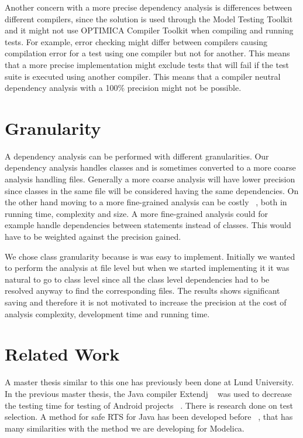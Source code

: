 \documentclass{cslthse-msc}
\begin{document}
Another concern with a more precise dependency analysis is differences between different compilers, since the solution is used through the Model Testing Toolkit and it might not use OPTIMICA Compiler Toolkit  when compiling and running tests. For example, error checking might differ between compilers causing compilation error for a test using one compiler but not for another. This means that a more precise implementation might exclude tests that will fail if the test suite is executed using another compiler. This means that a compiler neutral dependency analysis with a 100\% precision might not be possible. 



\section{Granularity}
A dependency analysis can be performed with different granularities. Our dependency analysis handles classes and is sometimes converted to a more coarse analysis handling files. Generally a more coarse analysis will have lower precision since classes in the same file will be considered having the same dependencies. On the other hand moving to a more fine-grained analysis can be costly ~\cite{DBLP:conf/sigsoft/LegunsenHSLZM16}, both in running time, complexity and size. A more fine-grained analysis could for example handle dependencies between statements instead of classes. This would have to be weighted against the precision gained.

We chose class granularity because is was easy to implement. Initially we wanted to perform the analysis at file level but when we started implementing it it was natural to go to class level since all the class level dependencies had to be resolved anyway to find the corresponding files. The results shows significant saving and therefore it is not motivated to increase the precision at the cost of analysis complexity, development time and running time.

\section{Related Work}
A master thesis similar to this one has previously been done at Lund University. In the previous master thesis, the Java compiler Extendj ~\cite{DBLP:conf/oopsla/EkmanH07} was used to decrease the testing time for testing of Android projects ~\cite{kampe2012dependroid}. There is research done on test selection. A method for safe RTS for Java has been developed before ~\cite{DBLP:conf/pppj/OqvistHM16}, that has many similarities with the method we are developing for Modelica. 
\end{document}

